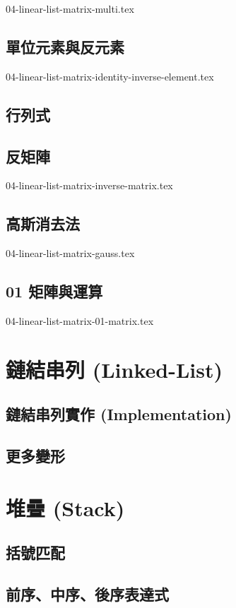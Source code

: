 \documentclass[12pt,a4paper,oneside]{report}
\begin{document}
\begin{CJK}{UTF8}{bkai}
{04-linear-list-matrix-multi.tex}

\subsection{單位元素與反元素}

{04-linear-list-matrix-identity-inverse-element.tex}

\subsection{行列式}
\subsection{反矩陣}

{04-linear-list-matrix-inverse-matrix.tex}

\subsection{高斯消去法}

{04-linear-list-matrix-gauss.tex}

\subsection{01 矩陣與運算}

{04-linear-list-matrix-01-matrix.tex}

\section{鏈結串列 (Linked-List)}
\subsection{鏈結串列實作 (Implementation)}
\subsection{更多變形}
\section{堆疊 (Stack)}
\subsection{括號匹配}
\subsection{前序、中序、後序表達式}

\end{CJK}
\end{document}
